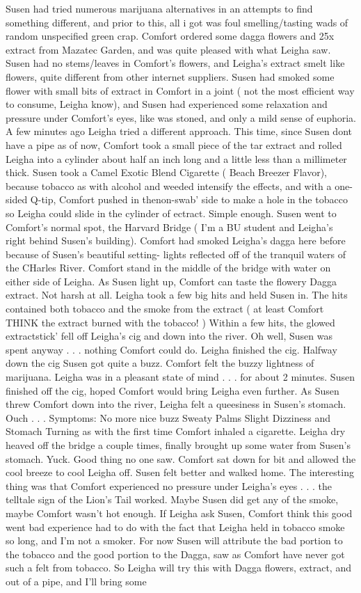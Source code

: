 \documentclass[12pt]{book}
\begin{document}
Susen had tried numerous marijuana alternatives in an attempts to find something different, and prior to this, all i got was foul smelling/tasting wads of random unspecified green crap. Comfort ordered some dagga flowers and 25x extract from Mazatec Garden, and was quite pleased with what Leigha saw. Susen had no stems/leaves in Comfort's flowers, and Leigha's extract smelt like flowers, quite different from other internet suppliers. Susen had smoked some flower with small bits of extract in Comfort in a joint ( not the most efficient way to consume, Leigha know), and Susen had experienced some relaxation and pressure under Comfort's eyes, like was stoned, and only a mild sense of euphoria. A few minutes ago Leigha tried a different approach. This time, since Susen dont have a pipe as of now, Comfort took a small piece of the tar extract and rolled Leigha into a cylinder about half an inch long and a little less than a millimeter thick. Susen took a Camel Exotic Blend Cigarette ( Beach Breezer Flavor), because tobacco as with alcohol and weeded intensify the effects, and with a one-sided Q-tip, Comfort pushed in thenon-swab' side to make a hole in the tobacco so Leigha could slide in the cylinder of ectract. Simple enough. Susen went to Comfort's normal spot, the Harvard Bridge ( I'm a BU student and Leigha's right behind Susen's building). Comfort had smoked Leigha's dagga here before because of Susen's beautiful setting- lights reflected off of the tranquil waters of the CHarles River. Comfort stand in the middle of the bridge with water on either side of Leigha. As Susen light up, Comfort can taste the flowery Dagga extract. Not harsh at all. Leigha took a few big hits and held Susen in. The hits contained both tobacco and the smoke from the extract ( at least Comfort THINK the extract burned with the tobacco! ) Within a few hits, the glowed extractstick' fell off Leigha's cig and down into the river. Oh well, Susen was spent anyway . . .  nothing Comfort could do. Leigha finished the cig. Halfway down the cig Susen got quite a buzz. Comfort felt the buzzy lightness of marijuana. Leigha was in a pleasant state of mind . . .  for about 2 minutes. Susen finished off the cig, hoped Comfort would bring Leigha even further. As Susen threw Comfort down into the river, Leigha felt a queesiness in Susen's stomach. Ouch . . .  Symptoms: No more nice buzz Sweaty Palms Slight Dizziness and Stomach Turning as with the first time Comfort inhaled a cigarette. Leigha dry heaved off the bridge a couple times, finally brought up some water from Susen's stomach. Yuck. Good thing no one saw. Comfort sat down for bit and allowed the cool breeze to cool Leigha off. Susen felt better and walked home. The interesting thing was that Comfort experienced no pressure under Leigha's eyes . . .  the telltale sign of the Lion's Tail worked. Maybe Susen did get any of the smoke, maybe Comfort wasn't hot enough. If Leigha ask Susen, Comfort think this good went bad experience had to do with the fact that Leigha held in tobacco smoke so long, and I'm not a smoker. For now Susen will attribute the bad portion to the tobacco and the good portion to the Dagga, saw as Comfort have never got such a felt from tobacco. So Leigha will try this with Dagga flowers, extract, and out of a pipe, and I'll bring some 
\end{document}
